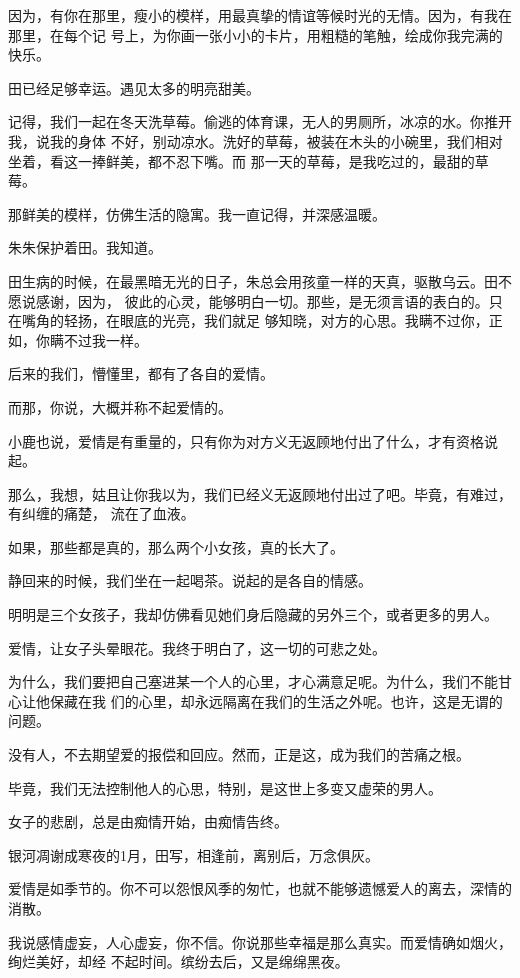 		因为，有你在那里，瘦小的模样，用最真挚的情谊等候时光的无情。因为，有我在那里，在每个记
	号上，为你画一张小小的卡片，用粗糙的笔触，绘成你我完满的快乐。

		田已经足够幸运。遇见太多的明亮甜美。

		记得，我们一起在冬天洗草莓。偷逃的体育课，无人的男厕所，冰凉的水。你推开我，说我的身体
	不好，别动凉水。洗好的草莓，被装在木头的小碗里，我们相对坐着，看这一捧鲜美，都不忍下嘴。而
	那一天的草莓，是我吃过的，最甜的草莓。

		那鲜美的模样，仿佛生活的隐寓。我一直记得，并深感温暖。

		朱朱保护着田。我知道。


		田生病的时候，在最黑暗无光的日子，朱总会用孩童一样的天真，驱散乌云。田不愿说感谢，因为，
	彼此的心灵，能够明白一切。那些，是无须言语的表白的。只在嘴角的轻扬，在眼底的光亮，我们就足
	够知晓，对方的心思。我瞒不过你，正如，你瞒不过我一样。

		后来的我们，懵懂里，都有了各自的爱情。

		而那，你说，大概并称不起爱情的。

		小鹿也说，爱情是有重量的，只有你为对方义无返顾地付出了什么，才有资格说起。

		那么，我想，姑且让你我以为，我们已经义无返顾地付出过了吧。毕竟，有难过，有纠缠的痛楚，
	流在了血液。

		如果，那些都是真的，那么两个小女孩，真的长大了。


		静回来的时候，我们坐在一起喝茶。说起的是各自的情感。

		明明是三个女孩子，我却仿佛看见她们身后隐藏的另外三个，或者更多的男人。

		爱情，让女子头晕眼花。我终于明白了，这一切的可悲之处。


		为什么，我们要把自己塞进某一个人的心里，才心满意足呢。为什么，我们不能甘心让他保藏在我
	们的心里，却永远隔离在我们的生活之外呢。也许，这是无谓的问题。

		没有人，不去期望爱的报偿和回应。然而，正是这，成为我们的苦痛之根。\par
		毕竟，我们无法控制他人的心思，特别，是这世上多变又虚荣的男人。\par
		女子的悲剧，总是由痴情开始，由痴情告终。


		银河凋谢成寒夜的1月，田写，相逢前，离别后，万念俱灰。\par
		爱情是如季节的。你不可以怨恨风季的匆忙，也就不能够遗憾爱人的离去，深情的消散。

		我说感情虚妄，人心虚妄，你不信。你说那些幸福是那么真实。而爱情确如烟火，绚烂美好，却经
	不起时间。缤纷去后，又是绵绵黑夜。

